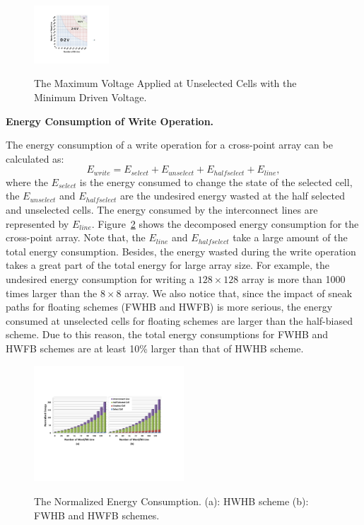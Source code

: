\begin{figure}%
\centering
  \includegraphics[width=0.25\textwidth]{./figures/Theoretical_bound2.pdf}\\
  \caption{The Maximum Voltage Applied at Unselected Cells with the Minimum Driven Voltage.}\label{fig:half}
  \vspace{-10pt}
\end{figure}



\vspace{6pt} \textbf{Energy Consumption of Write Operation.} \vspace{6pt}

The energy consumption of a write operation for a cross-point array can be calculated as:
\begin{equation}
E_{write} = E_{select} + E_{unselect} + E_{halfselect} + E_{line},
\end{equation}
where the $E_{select}$ is the energy consumed to change the state of the
selected cell, the $E_{unselect}$ and $E_{halfselect}$ are the undesired energy wasted at the half selected and unselected cells. The energy consumed by the interconnect lines are represented by $E_{line}$. Figure~\ref{fig:energy} shows the decomposed energy consumption for the cross-point array. Note that, the $E_{line}$ and $E_{halfselect}$ take a large amount of the total energy consumption. Besides, the energy wasted during the write operation takes a great part of the total energy for large array size. For example, the undesired energy consumption for writing a $128{\times}128$ array is more than 1000 times larger than the $8{\times}8$ array. We also notice that, since the impact of sneak paths for floating schemes (FWHB and HWFB) is more serious, the energy consumed at unselected cells for floating schemes are larger than the half-biased scheme. Due to this reason, the total energy consumptions for FWHB and HWFB schemes are at least 10\% larger than that of HWHB scheme.


\begin{figure}%
\centering
  \includegraphics[width=0.5\textwidth]{./figures/energy4.pdf}\\
  \caption{The Normalized Energy Consumption. (a): HWHB scheme (b): FWHB and HWFB schemes.}\label{fig:energy}
\end{figure}

